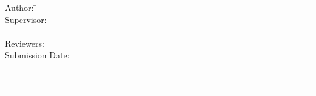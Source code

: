 \begin{center}
	\parbox{2.5cm}{
			\begin{tabbing}
				Author: \hspace{2cm}
					\=\authorOfThesis\\[2mm]
				Supervisor: 
					\>\supervisorOne\\[2mm]
					\>\supervisorTwo\\[2mm]
				Reviewers: 
					\>\reviewerOne\\[1mm]
				Submission Date: 
					\>\submissionDate\\
			\end{tabbing}
	}\\
	\hrule
\end{center}
